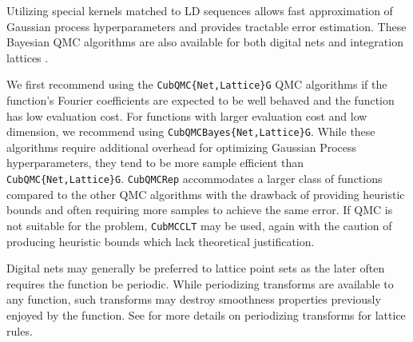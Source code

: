 \documentclass{article}[12pt]
\begin{document}
\begin{description}
    Utilizing special kernels matched to LD sequences allows fast approximation of Gaussian process hyperparameters and provides tractable error estimation. These Bayesian QMC algorithms are also available for both digital nets \cite{JagThesis19a} and integration lattices  \cite{cubqmcbayeslattice}. 
\end{description}

We first recommend using the  \texttt{CubQMC\{Net,Lattice\}G} QMC algorithms if the function's Fourier coefficients are expected to be well behaved and the function has low evaluation cost. For functions with larger evaluation cost and low dimension, we recommend using  \texttt{CubQMCBayes\{Net,Lattice\}G}. While these algorithms require additional overhead for optimizing Gaussian Process hyperparameters, they tend to be more sample efficient than \texttt{CubQMC\{Net,Lattice\}G}. \texttt{CubQMCRep} accommodates a larger class of functions compared to the other QMC algorithms with the drawback of providing heuristic bounds and often requiring more samples to achieve the same error. If QMC is not suitable for the problem, \texttt{CubMCCLT} may be used, again with the caution of producing heuristic bounds which lack theoretical justification.

Digital nets may generally be preferred to lattice point sets as the later often requires the function be periodic. While periodizing transforms are available to any function, such transforms may destroy smoothness properties previously enjoyed by the function. See \cite[Chapter 16]{mcbook} for more details on periodizing transforms for lattice rules.

\end{document}
